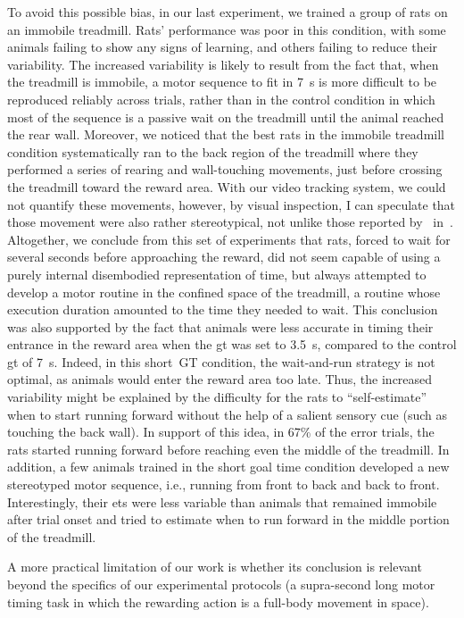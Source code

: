To avoid this possible bias, in our last experiment, we trained a group of rats on an immobile treadmill.
Rats' performance was poor in this condition, with some animals failing to show any signs of learning, and others failing to reduce their variability.
The increased variability is likely to result from the fact that, when the treadmill is immobile, a motor sequence to fit in 7~s is more difficult to be reproduced reliably across trials, rather than in the control condition in which most of the sequence is a passive wait on the treadmill until the animal reached the rear wall.
Moreover, we noticed that the best rats in the immobile treadmill condition systematically ran to the back region of the treadmill where they performed a series of rearing and wall-touching movements, just before crossing the treadmill toward the reward area.
With our video tracking system, we could not quantify these movements, however, by visual inspection, I can speculate that those movement were also rather stereotypical, not unlike those reported by~\citeauthor{Kawai2015} in~\cite{Kawai2015}.
Altogether, we conclude from this set of experiments that rats, forced to wait for several seconds before approaching the reward, did not seem capable of using a purely internal disembodied representation of time, but always attempted to develop a motor routine in the confined space of the treadmill, a routine whose execution duration amounted to the time they needed to wait.
This conclusion was also supported by the fact that animals were less accurate in timing their entrance in the reward area when the \gls{gt} was set to 3.5~s, compared to the control \gls{gt} of 7~s.
Indeed, in this short~GT condition, the wait-and-run strategy is not optimal, as animals would enter the reward area too late.
Thus, the increased variability might be explained by the difficulty for the rats to ``self-estimate'' when to start running forward without the help of a salient sensory cue (such as touching the back wall).
In support of this idea, in 67\% of the error trials, the rats started running forward before reaching even the middle of the treadmill.
In addition, a few animals trained in the short goal time condition developed a new stereotyped motor sequence, i.e., running from front to back and back to front.
Interestingly, their \glspl{et} were less variable than animals that remained immobile after trial onset and tried to estimate when to run forward in the middle portion of the treadmill.
\par
A more practical limitation of our work is whether its conclusion is relevant beyond the specifics of our experimental protocols (a supra-second long motor timing task in which the rewarding action is a full-body movement in space).
